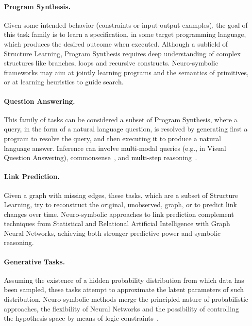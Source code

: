 \paragraph{Program Synthesis.} Given some intended behavior (constraints or input-output examples), the goal of this task family is to learn a specification, in some target programming language, which produces the desired outcome when executed. Although a subfield of Structure Learning, Program Synthesis requires deep understanding of complex structures like branches, loops and recursive constructs. Neuro-symbolic frameworks may aim at jointly learning programs and the semantics of primitives, or at learning heuristics to guide search.

\paragraph{Question Answering.} This family of tasks can be considered a subset of Program Synthesis, where a query, in the form of a natural language question, is resolved by generating first a program to resolve the query, and then executing it to produce a natural language answer. Inference can involve multi-modal queries (e.g., in Visual Question Answering), commonsense~\cite{ma2019towards}, and multi-step reasoning~\cite{zelikman2022star}.

\paragraph{Link Prediction.} Given a graph with missing edges, these tasks, which are a subset of Structure Learning, try to reconstruct the original, unobserved, graph, or to predict link changes over time. Neuro-symbolic approaches to link prediction complement techniques from Statistical and Relational Artificial Intelligence with Graph Neural Networks, achieving both stronger predictive power and symbolic reasoning.

\paragraph{Generative Tasks.} Assuming the existence of a hidden probability distribution from which data has been sampled, these tasks attempt to approximate the latent parameters of such distribution. %
Neuro-symbolic methods merge the principled nature of probabilistic approaches, the flexibility of Neural Networks and the possibility of controlling the hypothesis space by means of logic constraints~\cite{misino2022vael}.

